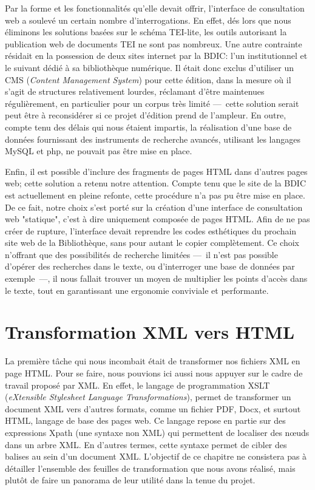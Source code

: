 \documentclass[12pt,a4paper]{book} %
\begin{document}
Par la forme et les fonctionnalités qu'elle devait offrir, l'interface de consultation web a soulevé un certain nombre d'interrogations. En effet, dés lors que nous éliminons les solutions basées sur le schéma TEI-lite, les outils autorisant la publication web de documents TEI ne sont pas nombreux. Une autre contrainte résidait en la possession de deux sites internet par la BDIC: l'un institutionnel et le suivant dédié à sa bibliothèque numérique. Il était donc exclus d'utiliser un CMS (\textit{Content Management System}) pour cette édition, dans la mesure où il s'agit de structures relativement lourdes, réclamant d'être maintenues régulièrement, en particulier pour un corpus très limité ---~cette solution serait peut être à reconsidérer si ce projet d'édition prend de l'ampleur.
En outre, compte tenu des délais qui nous étaient impartis, la réalisation d'une base de données fournissant des instruments de recherche avancés, utilisant les langages MySQL et php, ne pouvait pas être mise en place. 

Enfin, il est possible d'inclure des fragments de pages HTML dans d'autres pages web; cette solution a retenu notre attention. Compte tenu que le site de la BDIC est actuellement en pleine refonte, cette procédure n'a pas pu être mise en place. De ce fait, notre choix s'est porté sur la création d'une interface de consultation web "statique", c'est à dire uniquement composée de pages HTML. Afin de ne pas créer de rupture, l'interface devait reprendre les codes esthétiques du prochain site web de la Bibliothèque, sans pour autant le copier complètement. Ce choix n'offrant que des possibilités de recherche limitées ---~il n'est pas possible d'opérer des recherches dans le texte, ou d'interroger une base de données par exemple~---, il nous fallait trouver un moyen de multiplier les points d'accès dans le texte, tout en garantissant une ergonomie conviviale et performante.

\chapter{Transformation XML vers HTML}

La première tâche qui nous incombait était de transformer nos fichiers XML en page HTML. Pour se faire, nous pouvions ici aussi nous appuyer sur le cadre de travail proposé par XML. En effet, le langage de programmation XSLT (\textit{eXtensible Stylesheet Language Transformations}), permet de transformer un document XML vers d'autres formats, comme un fichier PDF, Docx, et surtout HTML, langage de base des pages web.
Ce langage repose en partie sur des expressions Xpath (une syntaxe non XML) qui permettent de localiser des nœuds dans un arbre XML. En d'autres termes, cette syntaxe permet de cibler des balises au sein d'un document XML. L'objectif de ce chapitre ne consistera pas à détailler l'ensemble des feuilles de transformation que nous avons réalisé, mais plutôt de faire un panorama de leur utilité dans la tenue du projet.
\end{document}
